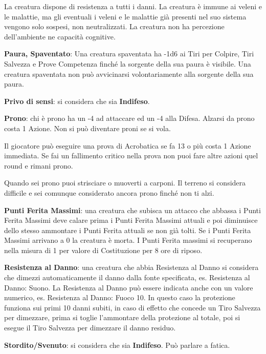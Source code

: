 \begin{multicols}{2}
La creatura dispone di resistenza a tutti i danni. La creatura è immune ai veleni e le malattie, ma gli eventuali i veleni e le malattie già presenti nel suo sistema vengono solo sospesi, non neutralizzati. La creatura non ha percezione dell'ambiente ne capacità cognitive.

\textbf{Paura, Spaventato}:\hypertarget{condizionepaura}{} 
Una creatura spaventata ha -1d6 ai Tiri per Colpire, Tiri Salvezza e Prove Competenza finché la sorgente della sua paura è visibile. Una creatura spaventata non può avvicinarsi volontariamente alla sorgente della sua paura.

\textbf{Privo di sensi}: si considera che sia \textbf{Indifeso}.

\textbf{Prono}: chi è prono ha un -4 ad attaccare ed un -4 alla Difesa. Alzarsi da prono costa 1 Azione. Non si può diventare proni se si vola.

Il giocatore può eseguire una prova di Acrobatica se fa 13 o più costa 1 Azione immediata. Se fai un fallimento critico nella prova non puoi fare altre azioni quel round e rimani prono.

Quando sei prono puoi strisciare o muoverti a carponi. Il terreno si considera difficile e sei comunque considerato ancora prono finché non ti alzi.

\textbf{Punti Ferita Massimi}: una creatura che subisca un attacco che abbassa i Punti Ferita Massimi deve calare prima i Punti Ferita Massimi attuali e poi diminuisce dello stesso ammontare i Punti Ferita attuali se non già tolti. Se i Punti Ferita Massimi arrivano a 0 la creatura è morta. I Punti Ferita massimi si recuperano nella misura di 1 per valore di Costituzione per 8 ore di riposo.

\textbf{Resistenza al Danno}: una creatura che abbia Resistenza al Danno si considera che dimezzi automaticamente il danno dalla fonte specificata, es. Resistenza al Danno: Suono. La Resistenza al Danno può essere indicata anche con un valore numerico, es. Resistenza al Danno: Fuoco 10. In questo caso la protezione funziona sui primi 10 danni subiti, in caso di effetto che concede un Tiro Salvezza per dimezzare, prima si toglie l'ammontare della protezione al totale, poi si esegue il Tiro Salvezza per dimezzare il danno residuo.

\textbf{Stordito/Svenuto}: si considera che sia \textbf{Indifeso}. Può parlare a fatica.


\end{multicols}
